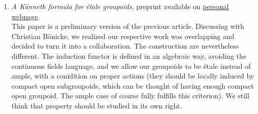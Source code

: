 \documentclass[a4paper]{article}
\begin{document}
\begin{enumerate}
\item \textit{A K\"{u}nneth formula for \'etale groupoids}, preprint available on \href{http://math.hawaii.edu/~dellaiera/Research.html}{personal webpage}.\\

This paper is a preliminary version of the previous article. Discussing with Christian B\"onicke, we realized our respective work was overlapping and decided to turn it into a collaboration. The construction are nevertheless different.  The induction functor is defined in an algebraic way, avoiding the continuous fields language, and we allow our groupoids to be \'etale instead of ample, with a conidition on proper actions (they should be locally induced by compact open subgroupoids, which can be thought of having enough compact open groupoid. The ample case of course fully fulfills this criterion). We still think that property should be studied in its own right.
\end{enumerate}





 
\end{document}
